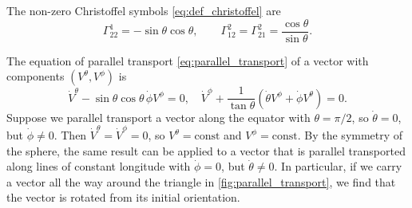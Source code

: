The non-zero Christoffel symbols \eqref{eq:def_christoffel} are
\begin{equation}
	\Gamma^1_{22} = -\sin \theta \cos \theta , \qquad
	\Gamma^2_{12} = \Gamma^2_{21} = \frac{\cos \theta}{\sin \theta} .
\end{equation}

The equation of parallel transport \eqref{eq:parallel_transport} of a vector with components $(V^\theta, V^\phi)$ is
\begin{equation}
	\dot{V}^\theta - \sin\theta \cos\theta \, \dot\phi V^\phi = 0,
	\quad
	\dot{V}^\phi + \frac{1}{\tan\theta} \left( \dot\theta V^\phi + \dot\phi V^\theta \right) = 0.
\end{equation}
Suppose we parallel transport a vector along the equator with $\theta = \pi/2$, so $\dot\theta = 0$, but $\dot\phi \neq 0$.
Then $\dot{V}^\theta = \dot{V}^\phi = 0$, so $V^\theta = \text{const}$ and $V^\phi = \text{const}$.
By the symmetry of the sphere, the same result can be applied to a vector that is parallel transported along lines of constant longitude with $\dot\phi = 0$, but $\dot\theta \neq 0$.
In particular, if we carry a vector all the way around the triangle in \cref{fig:parallel_transport}, we find that the vector is rotated from its initial orientation.

